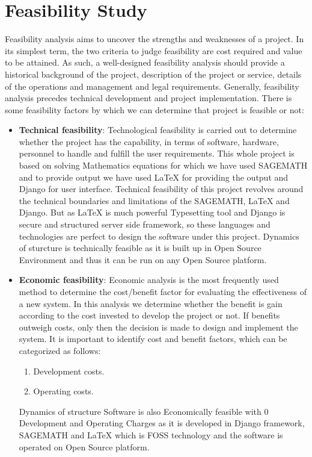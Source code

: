 \section{Feasibility Study}
Feasibility analysis aims to uncover the strengths and weaknesses of 
a project. In its simplest term, the two criteria to judge feasibility 
are cost required and value to be attained. As such, a well-designed 
feasibility analysis should provide a historical background of the 
project, description of the project or service, details of the 
operations and management and legal requirements. Generally, feasibility 
analysis precedes technical development and project implementation. 
There is some feasibility factors by which we can determine that 
project is feasible or not:
\begin{itemize}
\item {\bf{Technical feasibility}}: Technological feasibility is carried 
out to determine whether the project has the capability, in terms of 
software, hardware, personnel to handle and fulfill the user 
requirements. This whole project is based on solving Mathematics equations for which we have used SAGEMATH and to provide output we have used \LaTeX{} for providing the output and Django for user interface. Technical feasibility of this project revolves around the technical boundaries and limitations of the SAGEMATH, \LaTeX{} and Django. But as \LaTeX{} is much powerful Typesetting tool and Django is secure and structured server side framework, so these languages and technologies are perfect to design the software under this project. Dynamics of sturcture is technically feasible as it is built up in Open 
Source Environment and thus it can be run on any Open Source platform.

\item {\bf{Economic feasibility}}: Economic analysis is the most 
frequently used method to determine the cost/benefit factor for 
evaluating the effectiveness of a new system. In this analysis we 
determine whether the benefit is gain according to the cost invested 
to develop the project or not. If benefits outweigh costs, only then 
the decision is made to design and implement the system. It is 
important to identify cost and benefit factors, which can be categorized 
as follows:
\begin{enumerate}
\item Development costs.
\item Operating costs.
\end{enumerate}
Dynamics of structure Software is also Economically feasible with 0 Development 
and Operating Charges as it is developed in Django framework, SAGEMATH and \LaTeX{}  which is FOSS technology and the software is operated on Open 
Source platform.


\end{itemize}

